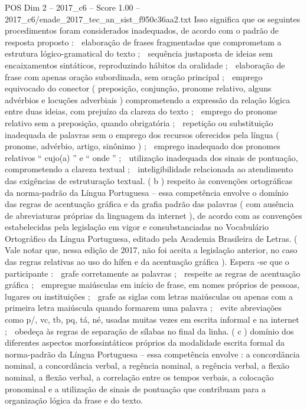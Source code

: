 \begin{textsample}{POS Dim 2 – 2017\_c6 – Score 1.00 – 2017\_c6/enade\_2017\_tec\_an\_sist\_f950c36aa2.txt}
Isso significa que os seguintes procedimentos foram considerados inadequados, de acordo com o padrão de resposta proposto :  elaboração de frases fragmentadas que comprometam a estrutura lógico-gramatical do texto ;  sequência justaposta de ideias sem encaixamentos sintáticos, reproduzindo hábitos da oralidade ;  elaboração de frase com apenas oração subordinada, sem oração principal ;  emprego equivocado do conector ( preposição, conjunção, pronome relativo, alguns advérbios e locuções adverbiais ) comprometendo a expressão da relação lógica entre duas ideias, com prejuízo da clareza do texto ;  emprego do pronome relativo sem a preposição, quando obrigatória ;  repetição ou substituição inadequada de palavras sem o emprego dos recursos oferecidos pela língua ( pronome, advérbio, artigo, sinônimo ) ;  emprego inadequado dos pronomes relativos “ cujo(a) ” e “ onde ” ;  utilização inadequada dos sinais de pontuação, comprometendo a clareza textual ;  inteligibilidade relacionada ao atendimento das exigências de estruturação textual. ( b ) respeito às convenções ortográficas da norma-padrão da Língua Portuguesa – essa competência envolve o domínio das regras de acentuação gráfica e da grafia padrão das palavras ( com ausência de abreviaturas próprias da linguagem da internet ), de acordo com as convenções estabelecidas pela legislação em vigor e consubstanciadas no Vocabulário Ortográfico da Língua Portuguesa, editado pela Academia Brasileira de Letras. ( Vale notar que, nessa edição de 2017, não foi aceita a legislação anterior, no caso das regras relativas ao uso do hífen e da acentuação gráfica ).
Espera -se que o participante :  grafe corretamente as palavras ;  respeite as regras de acentuação gráfica ;  empregue maiúsculas em início de frase, em nomes próprios de pessoas, lugares ou instituições ;  grafe as siglas com letras maiúsculas ou apenas com a primeira letra maiúscula quando formarem uma palavra ;  evite abreviações como p/, vc, tb, pq, tá, né, usadas muitas vezes em escrita informal e na internet ;  obedeça às regras de separação de sílabas no final da linha. ( c ) domínio dos diferentes aspectos morfossintáticos próprios da modalidade escrita formal da norma-padrão da Língua Portuguesa – essa competência envolve : a concordância nominal, a concordância verbal, a regência nominal, a regência verbal, a flexão nominal, a flexão verbal, a correlação entre os tempos verbais, a colocação pronominal e a utilização de sinais de pontuação que contribuam para a organização lógica da frase e do texto.

\end{textsample}
